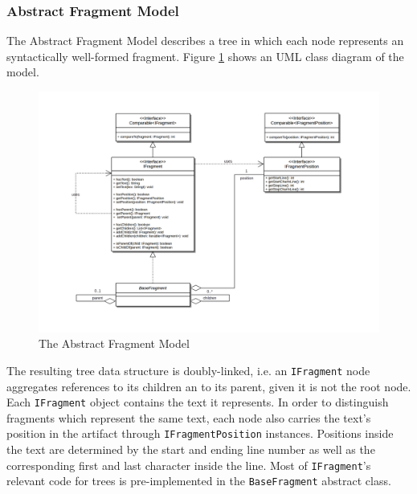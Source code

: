 \subsubsection{Abstract Fragment Model}
\label{subsubsection:AbstractFragmentModel}
The Abstract Fragment Model describes a tree in which each node represents an syntactically well-formed fragment.
Figure \ref{figure:FragmentModel} shows an \gls{UML} class diagram of the model.
\begin{figure}[h!]
\begin{center}
\includegraphics[width=\textwidth]{images/FragmentModel.png}
\end{center}
\caption{The Abstract Fragment Model}
\label{figure:FragmentModel}
\end{figure}
The resulting tree data structure is doubly-linked, i.e. an \texttt{IFragment} node aggregates references to its children an to its parent, given it is not the root node.
Each \texttt{IFragment} object contains the text it represents.
In order to distinguish fragments which represent the same text, each node also carries the text's position in the artifact through \texttt{IFragmentPosition} instances.
Positions inside the text are determined by the start and ending line number as well as the corresponding first and last character inside the line.
Most of \texttt{IFragment}'s relevant code for trees is pre-implemented in the \texttt{BaseFragment} abstract class.

